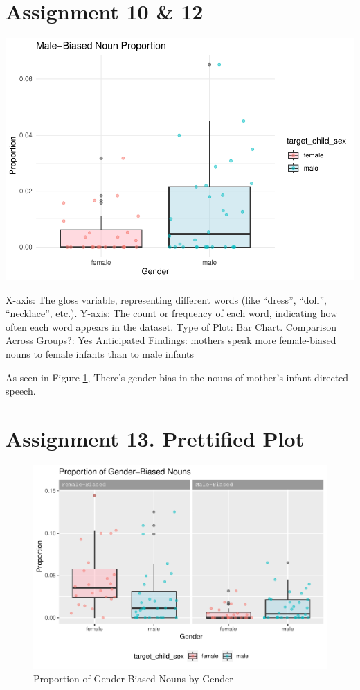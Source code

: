 \documentclass[
  man]{apa6}
\begin{document}
\hypertarget{assignment-10-12}{%
\section{Assignment 10 \& 12}\label{assignment-10-12}}

\includegraphics{My-Notebook_files/figure-latex/male-nouns-1.pdf}

X-axis: The gloss variable, representing different words (like ``dress'', ``doll'', ``necklace'', etc.). Y-axis: The count or frequency of each word, indicating how often each word appears in the dataset. Type of Plot: Bar Chart. Comparison Across Groups?: Yes Anticipated Findings: mothers speak more female-biased nouns to female infants than to male infants

As seen in Figure \ref{fig:my-figure}, There's gender bias in the nouns of mother's infant-directed speech.

\hypertarget{assignment-13.-prettified-plot}{%
\section{Assignment 13. Prettified Plot}\label{assignment-13.-prettified-plot}}

\begin{figure}
\centering
\includegraphics{My-Notebook_files/figure-latex/my-figure-1.pdf}
\caption{\label{fig:my-figure}Proportion of Gender-Biased Nouns by Gender}
\end{figure}
\end{document}
